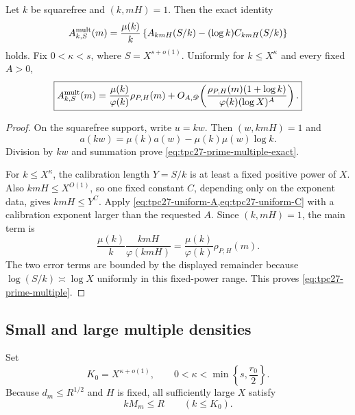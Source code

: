 \begin{lemma}
\label{lem:tpc27-prime-multiple}
Let \(k\) be squarefree and \((k,mH)=1\).  Then the exact identity
\begin{equation}
 A_{k,S}^{\rm mult}(m)
 =\frac{\mu(k)}k
 \left\{
 A_{kmH}(S/k)-(\log k)C_{kmH}(S/k)
 \right\}
 \label{eq:tpc27-prime-multiple-exact}
\end{equation}
holds.  Fix \(0<\kappa<s\), where
\(S=X^{s+o(1)}\).  Uniformly for \(k\le X^\kappa\) and every fixed
\(A>0\),
\begin{equation}
 \boxed{
 A_{k,S}^{\rm mult}(m)
 =\frac{\mu(k)}{\varphi(k)}\rho_{P,H}(m)
 +O_{A,\mathscr D}\!\left(
 \frac{\rho_{P,H}(m)(1+\log k)}
 {\varphi(k)(\log X)^A}
 \right).}
 \label{eq:tpc27-prime-multiple}
\end{equation}
\end{lemma}

\begin{proof}
On the squarefree support, write \(u=kw\).  Then
\((w,kmH)=1\) and
\begin{equation}
 a(kw)=\mu(k)a(w)-\mu(k)\mu(w)\log k.
 \label{eq:tpc27-a-kw}
\end{equation}
Division by \(kw\) and summation prove
\eqref{eq:tpc27-prime-multiple-exact}.

For \(k\le X^\kappa\), the calibration length
\(Y=S/k\) is at least a fixed positive power of \(X\).  Also
\(kmH\le X^{O(1)}\), so one fixed constant \(C\), depending only on
the exponent data, gives \(kmH\le Y^C\).  Apply
\cref{eq:tpc27-uniform-A,eq:tpc27-uniform-C} with a calibration
exponent larger than the requested \(A\).  Since \((k,mH)=1\), the
main term is
\begin{equation}
 \frac{\mu(k)}k\frac{kmH}{\varphi(kmH)}
 =\frac{\mu(k)}{\varphi(k)}\rho_{P,H}(m).
\end{equation}
The two error terms are bounded by the displayed remainder because
\(\log(S/k)\asymp\log X\) uniformly in this fixed-power range.  This
proves \eqref{eq:tpc27-prime-multiple}.
\end{proof}

\subsection{Small and large multiple densities}

Set
\begin{equation}
 K_0=X^{\kappa+o(1)},
 \qquad
 0<\kappa<\min\left\{s,\frac{r_0}{2}\right\}.
 \label{eq:tpc27-K0}
\end{equation}
Because \(d_m\le R^{1/2}\) and \(H\) is fixed, all sufficiently large
\(X\) satisfy
\begin{equation}
 kM_m\le R
 \qquad(k\le K_0).
 \label{eq:tpc27-small-k-model-range}
\end{equation}

